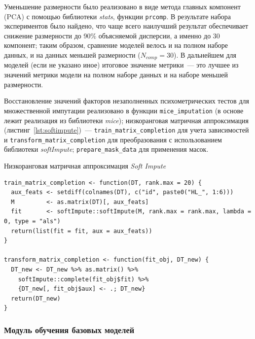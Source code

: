 Уменьшение размерности было реализовано в виде метода главных компонент (PCA) с помощью библиотеки \emph{stats}, функции \lstinline{prcomp}. В результате набора экспериментов было найдено, что чаще всего наилучший результат обеспечивает снижение размерности до 90\% объясняемой дисперсии, а именно до 30 компонент; таким образом, сравнение моделей велось и на полном наборе данных, и на данных меньшей размерности ($N_{comp} = 30$). В дальнейшем для моделей (если не указано иное) итоговое значение метрики~--- это лучшее из значений метрики модели на полном наборе данных и на наборе меньшей размерности.

Восстановление значений факторов незаполненных психометрических тестов для множественной импутации реализовано в функции \lstinline{mice_imputation} (в основе лежит реализация из библиотеки \emph{mice}); низко\-ранговая матричная аппрокси\-мация (\mbox{листинг}~\ref{lst:softimpute})~--- \lstinline{train_matrix_completion} для учета зависимостей и \lstinline{transform_matrix_completion} для преобразования с использованием библиотеки \emph{softImpute}; \lstinline{prepare_mask_data} для применения масок.

\begin{listing}
    \caption{Низкоранговая матричная аппроксимация \emph{Soft Impute}}
    \label{lst:softimpute}
    \begin{verbatim}
train_matrix_completion <- function(DT, rank.max = 20) {
  aux_feats <- setdiff(colnames(DT), c("id", paste0("HL_", 1:6)))
  M         <- as.matrix(DT)[, aux_feats]
  fit       <- softImpute::softImpute(M, rank.max = rank.max, lambda = 0, type = "als")
  return(list(fit = fit, aux = aux_feats))
}

transform_matrix_completion <- function(fit_obj, DT_new) {
  DT_new <- DT_new %>% as.matrix() %>%
    softImpute::complete(fit_obj$fit) %>%
    {DT_new[, fit_obj$aux] <- .; DT_new}
  return(DT_new)
}
  \end{verbatim}
\end{listing}


\subsubsection{Модуль обучения базовых моделей}

